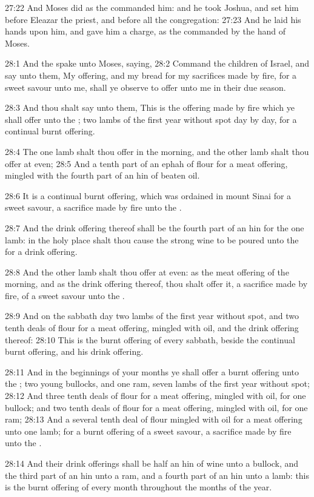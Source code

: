27:22 And Moses did as the \LORD commanded him: and he took Joshua, and
set him before Eleazar the priest, and before all the congregation:
27:23 And he laid his hands upon him, and gave him a charge, as the
\LORD commanded by the hand of Moses.

28:1 And the \LORD spake unto Moses, saying, 28:2 Command the children
of Israel, and say unto them, My offering, and my bread for my
sacrifices made by fire, for a sweet savour unto me, shall ye observe
to offer unto me in their due season.

28:3 And thou shalt say unto them, This is the offering made by fire
which ye shall offer unto the \LORD; two lambs of the first year
without spot day by day, for a continual burnt offering.

28:4 The one lamb shalt thou offer in the morning, and the other lamb
shalt thou offer at even; 28:5 And a tenth part of an ephah of flour
for a meat offering, mingled with the fourth part of an hin of beaten
oil.

28:6 It is a continual burnt offering, which was ordained in mount
Sinai for a sweet savour, a sacrifice made by fire unto the \LORD.

28:7 And the drink offering thereof shall be the fourth part of an hin
for the one lamb: in the holy place shalt thou cause the strong wine
to be poured unto the \LORD for a drink offering.

28:8 And the other lamb shalt thou offer at even: as the meat offering
of the morning, and as the drink offering thereof, thou shalt offer
it, a sacrifice made by fire, of a sweet savour unto the \LORD.

28:9 And on the sabbath day two lambs of the first year without spot,
and two tenth deals of flour for a meat offering, mingled with oil,
and the drink offering thereof: 28:10 This is the burnt offering of
every sabbath, beside the continual burnt offering, and his drink
offering.

28:11 And in the beginnings of your months ye shall offer a burnt
offering unto the \LORD; two young bullocks, and one ram, seven lambs
of the first year without spot; 28:12 And three tenth deals of flour
for a meat offering, mingled with oil, for one bullock; and two tenth
deals of flour for a meat offering, mingled with oil, for one ram;
28:13 And a several tenth deal of flour mingled with oil for a meat
offering unto one lamb; for a burnt offering of a sweet savour, a
sacrifice made by fire unto the \LORD.

28:14 And their drink offerings shall be half an hin of wine unto a
bullock, and the third part of an hin unto a ram, and a fourth part of
an hin unto a lamb: this is the burnt offering of every month
throughout the months of the year.

